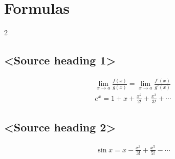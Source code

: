 \section*{Formulas}
\begin{multicols}{2}
\subsection*{<Source heading 1>}
\begin{gather*}
  \lim_{x\to a}\frac{f(x)}{g(x)}=\lim_{x\to a}\frac{f'(x)}{g'(x)}\\
  e^{x}=1+x+\frac{x^{2}}{2!}+\frac{x^{3}}{3!}+\cdots
\end{gather*}
\subsection*{<Source heading 2>}
\begin{gather*}
  \sin x=x-\frac{x^{3}}{3!}+\frac{x^{5}}{5!}-\cdots
\end{gather*}
\end{multicols}
